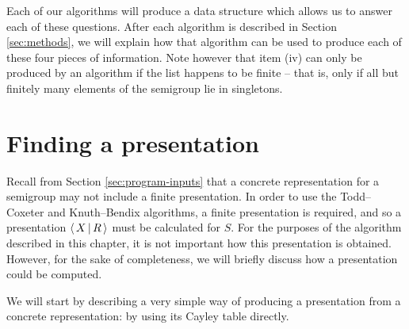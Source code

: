 Each of our algorithms will produce a data structure which allows us to answer
each of these questions.  After each algorithm is described in Section
\ref{sec:methods}, we will explain how that algorithm can be used to produce
each of these four pieces of information.  Note however that item (iv) can only
be produced by an algorithm if the list happens to be finite -- that is, only if
all but finitely many elements of the semigroup lie in singletons.

\section{Finding a presentation}
\label{sec:find-pres}

Recall from Section \ref{sec:program-inputs} that a concrete representation for
a semigroup may not include a finite presentation.  In order to use the Todd--Coxeter and
Knuth--Bendix algorithms, a finite presentation is required, and so a presentation
$\left\langle \, X \, \middle| \, R \, \right\rangle$ must be calculated for $S$.  For the purposes of the algorithm
described in this chapter, it is not important how this presentation is
obtained.  However, for the sake of completeness, we will briefly discuss how a
presentation could be computed.

We will start by describing a very simple way of producing a presentation from a
concrete representation: by using its Cayley table directly.

